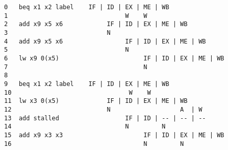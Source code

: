 \documentclass[varwidth]{standalone}
\begin{document}
  \begin{BVerbatim}[]
0   beq x1 x2 label    IF | ID | EX | ME | WB
1                                W    W
2   add x9 x5 x6            IF | ID | EX | ME | WB
3                           N
4   add x9 x5 x6                 IF | ID | EX | ME | WB
5                                N
6   lw x9 0(x5)                       IF | ID | EX | ME | WB
7                                     N
8
9   beq x1 x2 label    IF | ID | EX | ME | WB
10                                W    W
11  lw x3 0(x5)             IF | ID | EX | ME | WB
12                          N                   A  | W
13  add stalled                  IF | ID | -- | -- | --
14                               N         N
15  add x9 x3 x3                      IF | ID | EX | ME | WB
16                                    N         N
  \end{BVerbatim}
\end{document}
